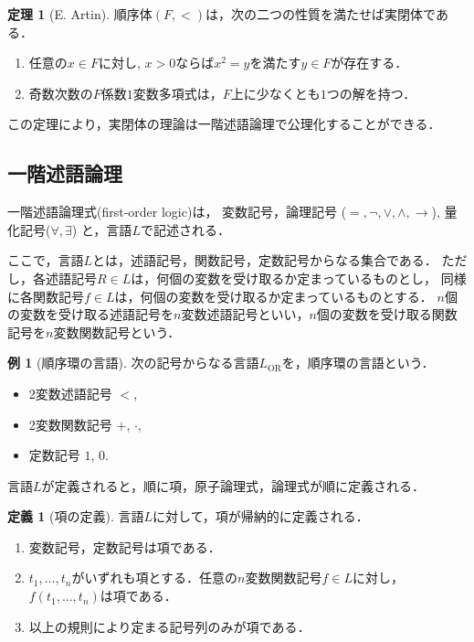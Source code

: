 \documentclass[uplatex, dvipdfmx]{jsarticle}
\theoremstyle{definition}
\newtheorem{definition}{定義}[section]
\newtheorem{theorem}{定理}[section]
\newtheorem{example}{例}[section]
\begin{document}
\begin{theorem}[E. Artin]
     順序体$(F,<)$は，次の二つの性質を満たせば実閉体である．
     \begin{enumerate}
          \item 任意の$x \in F$に対し, $x>0$ならば$x^2 = y$を満たす$y \in F$が存在する．
          \item 奇数次数の$F$係数$1$変数多項式は，$F$上に少なくとも$1$つの解を持つ．
     \end{enumerate}
\end{theorem}

この定理により，$実閉体$の理論は一階述語論理で公理化することができる．

\subsection{一階述語論理}

一階述語論理式(first-order logic)は，
変数記号，論理記号 ($=, \lnot, \lor, \land, \rightarrow$), 量化記号($\forall, \exists$)
と，言語$L$で記述される．

ここで，言語$L$とは，述語記号，関数記号，定数記号からなる集合である．
ただし，各述語記号$R \in L$は，何個の変数を受け取るか定まっているものとし，
同様に各関数記号$f \in L$は，何個の変数を受け取るか定まっているものとする．
$n$個の変数を受け取る述語記号を$n$変数述語記号といい，$n$個の変数を受け取る関数記号を$n$変数関数記号という．

\begin{example}[順序環の言語]
     次の記号からなる言語$L_\mathrm{OR}$を，順序環の言語という．
     \begin{itemize}
          \item 2変数述語記号 $<$,
          \item 2変数関数記号 $+$, $\cdot$,
          \item 定数記号 $1$, $0$.
     \end{itemize}
\end{example}

言語$L$が定義されると，順に項，原子論理式，論理式が順に定義される．

\begin{definition}[項の定義]
     言語$L$に対して，項が帰納的に定義される．
     \begin{enumerate}
          \item 変数記号，定数記号は項である．
          \item $t_1, \dots, t_n$がいずれも項とする．任意の$n$変数関数記号$f \in L$に対し，$f(t_1, \dots, t_n)$は項である．
          \item 以上の規則により定まる記号列のみが項である．
     \end{enumerate}
\end{definition}
\end{document}
